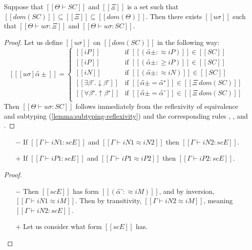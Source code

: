 \begin{lemma}
    \label{lemma:constraint-sat}
    Suppose that $[[Θ ⊢ SC]]$
    and $[[Ξ]]$ is a set such that
    $[[dom(SC)]] \subseteq [[Ξ]] \subseteq [[dom(Θ)]]$.
    Then there exists 
    $[[uσ]]$ such that 
    $[[ Θ  ⊢ uσ : Ξ ]]$ and
    $[[ Θ  ⊢ uσ : SC ]]$.
\end{lemma}
\begin{proof}
    Let us define $[[uσ]]$
    on $[[dom(SC)]]$ in the following way: 
    $$
    [[ [uσ]α̂± ]] = 
    \begin{cases}
        [[iP]]      & \text{if $[[(α̂± :≈ iP)]] \in [[SC]]$} \\
        [[iP]]      & \text{if $[[(α̂± :≥ iP)]] \in [[SC]]$} \\
        [[iN]]      & \text{if $[[(α̂± :≈ iN)]] \in [[SC]]$} \\
        [[∃β⁻.↓β⁻]] & \text{if $[[α̂± = α̂⁺]] \in [[Ξ \ dom(SC)]]$} \\
        [[∀β⁺.↑β⁺]] & \text{if $[[α̂± = α̂⁻]] \in [[Ξ \ dom(SC)]]$} \\
    \end{cases}
    $$
    Then $[[ Θ ⊢ uσ : SC ]]$ follows immediately
    from the reflexivity of equivalence and subtyping
    (\cref{lemma:subtyping-reflexivity}) and the corresponding
    rules 
    , 
    ,
    and .
\end{proof}


\begin{lemma}
    \label{lemma:entry-sat-equiv}
    \begin{itemize}
        \item [$-$] If $[[Γ ⊢ iN1 : scE]]$ and $[[Γ ⊢ iN1 ≈ iN2]]$ then $[[Γ ⊢ iN2 : scE]]$.
        \item [$+$] If $[[Γ ⊢ iP1 : scE]]$ and $[[Γ ⊢ iP1 ≈ iP2]]$ then $[[Γ ⊢ iP2 : scE]]$.
    \end{itemize}
\end{lemma}
\begin{proof}
    \begin{itemize}
        \item [$-$] Then $[[scE]]$ has form $[[(α̂⁻ :≈ iM)]]$, 
            and by inversion, $[[Γ ⊢ iN1 ≈ iM]]$.
            Then by transitivity, $[[Γ ⊢ iN2 ≈ iM]]$, 
            meaning $[[Γ ⊢ iN2 : scE]]$.
        \item [$+$] Let us consider what form $[[scE]]$ has.
    \end{itemize}
\end{proof}

